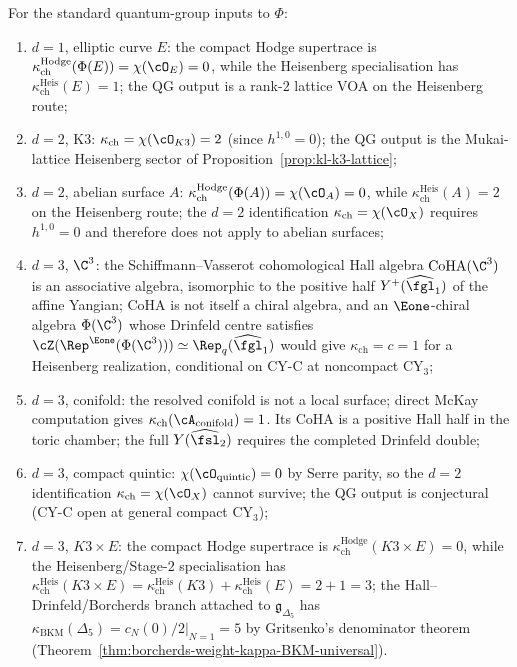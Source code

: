 \begin{proposition}
\label{prop:kappa-strat-qg-inputs}
For the standard quantum-group inputs to $\Phi$:
\begin{enumerate}[label=(\roman*)]
 \item $d = 1$, elliptic curve $E$: the compact Hodge supertrace is
 $\kappa_{\mathrm{ch}}^{\mathrm{Hodge}}(\Phi(E))=\chi(\cO_E)=0$,
 while the Heisenberg specialisation has
 $\kappa_{\mathrm{ch}}^{\mathrm{Heis}}(E)=1$; the QG output is a rank-$2$
 lattice VOA on the Heisenberg route;
 \item $d = 2$, K3: $\kappa_{\mathrm{ch}} = \chi(\cO_{K3}) = 2$
 (since $h^{1,0} = 0$); the QG output is the Mukai-lattice
 Heisenberg sector of Proposition~\ref{prop:kl-k3-lattice};
 \item $d = 2$, abelian surface $A$:
 $\kappa_{\mathrm{ch}}^{\mathrm{Hodge}}(\Phi(A))=\chi(\cO_A)=0$,
 while $\kappa_{\mathrm{ch}}^{\mathrm{Heis}}(A)=2$ on the
 Heisenberg route; the $d = 2$ identification
 $\kappa_{\mathrm{ch}}=\chi(\cO_X)$ requires $h^{1,0}=0$ and
 therefore does not apply to abelian surfaces;
 \item $d = 3$, $\C^3$: the Schiffmann--Vasserot cohomological
 Hall algebra $\mathrm{CoHA}(\C^3)$ is an associative algebra,
 isomorphic to the positive half $Y^+(\widehat{\fgl}_1)$ of the
 affine Yangian; $\mathrm{CoHA}$ is not itself a chiral algebra,
 and an $\Eone$-chiral algebra $\Phi(\C^3)$ whose Drinfeld centre
 satisfies
 $\cZ(\Rep^{\Eone}(\Phi(\C^3))) \simeq \Rep_q(\widehat{\fgl}_1)$
 would give $\kappa_{\mathrm{ch}} = c = 1$ for a Heisenberg
 realization, conditional on CY-C at noncompact CY$_3$;
 \item $d = 3$, conifold: the resolved conifold is not a local
 surface; direct McKay computation gives
 $\kappa_{\mathrm{ch}}(\cA_{\mathrm{conifold}})=1$. Its CoHA is a
 positive Hall half in the toric chamber; the full
 $Y(\widehat{\fsl}_2)$ requires the completed Drinfeld double;
 \item $d = 3$, compact quintic: $\chi(\cO_{\text{quintic}}) = 0$
 by Serre parity, so the $d = 2$ identification
 $\kappa_{\mathrm{ch}} = \chi(\cO_X)$ cannot survive; the QG
 output is conjectural (CY-C open at general compact CY$_3$);
 \item $d = 3$, $K3 \times E$:
 the compact Hodge supertrace is
 $\kappa_{\mathrm{ch}}^{\mathrm{Hodge}}(K3 \times E)=0$, while the
 Heisenberg/Stage-$2$ specialisation has
 $\kappa_{\mathrm{ch}}^{\mathrm{Heis}}(K3 \times E)
 = \kappa_{\mathrm{ch}}^{\mathrm{Heis}}(K3)
 + \kappa_{\mathrm{ch}}^{\mathrm{Heis}}(E) = 2 + 1 = 3$;
 the Hall--Drinfeld/Borcherds branch attached to
 $\mathfrak g_{\Delta_5}$ has
 $\kappa_{\mathrm{BKM}}(\Delta_5) = \left.c_N(0)/2\right|_{N=1}=5$ by
 Gritsenko's denominator theorem
 (Theorem~\ref{thm:borcherds-weight-kappa-BKM-universal}).
\end{enumerate}
\end{proposition}


